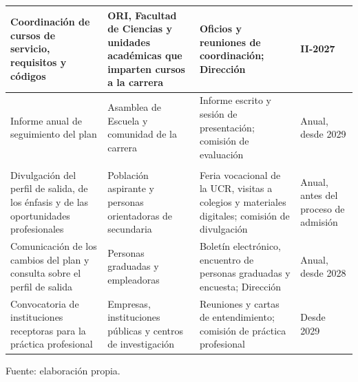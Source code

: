 \begin{longtable}{|>{\raggedright\arraybackslash}p{4.6cm}|>{\raggedright\arraybackslash}p{3.2cm}|>{\raggedright\arraybackslash}p{3.7cm}|>{\centering\arraybackslash}p{2.3cm}|}
Coordinación de cursos de servicio, requisitos y códigos & ORI, Facultad de Ciencias y unidades académicas que imparten cursos a la carrera & Oficios y reuniones de coordinación; Dirección & II-2027 \\ \hline
Informe anual de seguimiento del plan & Asamblea de Escuela y comunidad de la carrera & Informe escrito y sesión de presentación; comisión de evaluación & Anual, desde 2029 \\ \hline
\rowcolor{Celeste-UCR!35}\multicolumn{4}{|l|}{\cellcolor{Celeste-UCR!35}\textbf{Públicos externos}} \\ \hline
Divulgación del perfil de salida, de los énfasis y de las oportunidades profesionales & Población aspirante y personas orientadoras de secundaria & Feria vocacional de la UCR, visitas a colegios y materiales digitales; comisión de divulgación & Anual, antes del proceso de admisión \\ \hline
Comunicación de los cambios del plan y consulta sobre el perfil de salida & Personas graduadas y empleadoras & Boletín electrónico, encuentro de personas graduadas y encuesta; Dirección & Anual, desde 2028 \\ \hline
Convocatoria de instituciones receptoras para la práctica profesional & Empresas, instituciones públicas y centros de investigación & Reuniones y cartas de entendimiento; comisión de práctica profesional & Desde 2029 \\ \hline
\end{longtable}
%
\vspace{-0.8\baselineskip}
{\footnotesize Fuente: elaboración propia.\par}
\endgroup
\medskip


